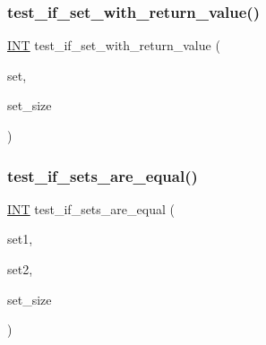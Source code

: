 \mbox{\label{sorting_8_c_ac8840ecabde4103e50ef1a7a8245d913}} 
\subsubsection{\texorpdfstring{test\+\_\+if\+\_\+set\+\_\+with\+\_\+return\+\_\+value()}{test\_if\_set\_with\_return\_value()}}
{\footnotesize\ttfamily \mbox{\hyperlink{galois_8h_a09fddde158a3a20bd2dcadb609de11dc}{I\+NT}} test\+\_\+if\+\_\+set\+\_\+with\+\_\+return\+\_\+value (\begin{DoxyParamCaption}\item[{\mbox{\hyperlink{galois_8h_a09fddde158a3a20bd2dcadb609de11dc}{I\+NT}} $\ast$}]{set,  }\item[{\mbox{\hyperlink{galois_8h_a09fddde158a3a20bd2dcadb609de11dc}{I\+NT}}}]{set\+\_\+size }\end{DoxyParamCaption})}

\mbox{\label{sorting_8_c_abd9436caf35fc01dd96cb8435459a20f}} 
\subsubsection{\texorpdfstring{test\+\_\+if\+\_\+sets\+\_\+are\+\_\+equal()}{test\_if\_sets\_are\_equal()}}
{\footnotesize\ttfamily \mbox{\hyperlink{galois_8h_a09fddde158a3a20bd2dcadb609de11dc}{I\+NT}} test\+\_\+if\+\_\+sets\+\_\+are\+\_\+equal (\begin{DoxyParamCaption}\item[{\mbox{\hyperlink{galois_8h_a09fddde158a3a20bd2dcadb609de11dc}{I\+NT}} $\ast$}]{set1,  }\item[{\mbox{\hyperlink{galois_8h_a09fddde158a3a20bd2dcadb609de11dc}{I\+NT}} $\ast$}]{set2,  }\item[{\mbox{\hyperlink{galois_8h_a09fddde158a3a20bd2dcadb609de11dc}{I\+NT}}}]{set\+\_\+size }\end{DoxyParamCaption})}

